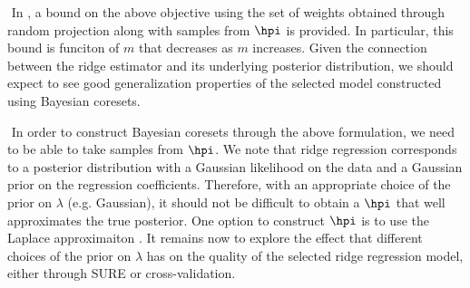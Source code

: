 $ $\newline
In \citet{campbell2019automated}, a bound on the above objective using the set of weights obtained through random projection \citep{rahimi2007random} along with samples from $\hpi$ is provided. In particular, this bound is funciton of $m$ that decreases as $m$ increases. Given the connection between the ridge estimator and its underlying posterior distribution, we should expect to see good generalization properties of the selected model constructed using Bayesian coresets.

$ $\newline
In order to construct Bayesian coresets through the above formulation, we need to be able to take samples from $\hpi$. We note that ridge regression corresponds to a posterior distribution with a Gaussian likelihood on the data and a Gaussian prior on the regression coefficients. Therefore, with an appropriate choice of the prior on $\lambda$ (e.g. Gaussian), it should not be difficult to obtain a $\hpi$ that well approximates the true posterior. One option to construct $\hpi$ is to use the Laplace approximaiton \citep{bishop2006pattern}. It remains now to explore the effect that different choices of the prior on $\lambda$ has on the quality of the selected ridge regression model, either through SURE or cross-validation.

